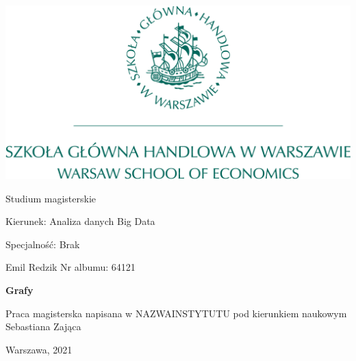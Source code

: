 \documentclass[12pt,a4paper,twoside,openany]{book}
\begin{document}
\begin{center}
  \includegraphics[scale=0.3]{sgh_full.png}

  \vspace{1cm}

  Studium magisterskie
\end{center}

\vspace{1cm}

\noindent Kierunek: Analiza danych Big Data

\noindent Specjalność: Brak

\vspace{1cm}

{
  \leftskip=10cm\noindent
  Emil Redzik\newline
  Nr albumu: 64121

}

\vspace{2cm}

\makeatletter

\begin{center}
  \LARGE\bf
  Grafy

\end{center}

\vspace{2cm}

{
  \leftskip=10cm\noindent
  Praca magisterska\newline
  napisana w NAZWAINSTYTUTU\newline
  pod kierunkiem naukowym\newline
  Sebastiana Zająca

}

\vfill

\begin{center}
  Warszawa, 2021
\end{center}
\thispagestyle{empty}
\end{document}
